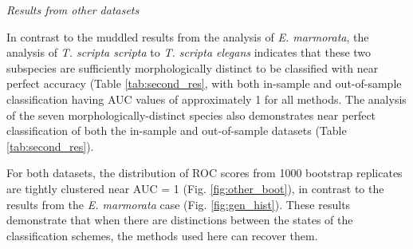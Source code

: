\documentclass[12pt,letterpaper]{article}
\renewcommand{\subsection}[1]{%
\bigskip
\begin{center}
\begin{large}
\normalfont\itshape #1
\end{large}
\end{center}}
\begin{document}
\clearpage
\subsection{Results from other datasets}

In contrast to the muddled results from the analysis of \textit{E. marmorata}, the analysis of \textit{T. scripta scripta} to \textit{T. scripta elegans} indicates that these two subspecies are sufficiently morphologically distinct to be classified with near perfect accuracy (Table \ref{tab:second_res}, with both in-sample and out-of-sample classification having AUC values of approximately 1 for all methods. The analysis of the seven morphologically-distinct species also demonstrates near perfect classification of both the in-sample and out-of-sample datasets (Table \ref{tab:second_res}). 

For both datasets, the distribution of ROC scores from 1000 bootstrap replicates are tightly clustered near AUC = 1 (Fig. \ref{fig:other_boot}), in contrast to the results from the \textit{E. marmorata} case (Fig. \ref{fig:gen_hist}). These results demonstrate that when there are distinctions between the states of the classification schemes, the methods used here can recover them.
\end{document}
